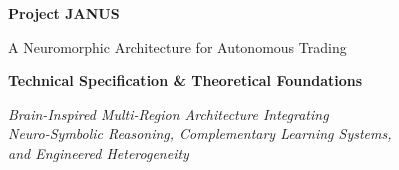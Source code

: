 \documentclass[12pt, a4paper]{article}
\begin{document}
\begin{titlepage}
	\singlespacing
	\centering
	\vspace*{0.4cm}

	{\Huge\bfseries\color{janusblue} Project JANUS\par}
	\vspace{0.3cm}
	{\Large\color{accentgold} A Neuromorphic Architecture for Autonomous Trading\par}
	\vspace{0.8cm}

	{\LARGE\bfseries Technical Specification \& Theoretical Foundations\par}
	\vspace{0.4cm}

	{\large\itshape Brain-Inspired Multi-Region Architecture Integrating\\Neuro-Symbolic Reasoning, Complementary Learning Systems,\\and Engineered Heterogeneity\/\par}
	\vspace{0.8cm}


\end{titlepage}
\end{document}
